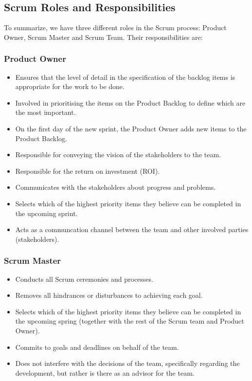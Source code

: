 \subsection{Scrum Roles and Responsibilities}

To summarize, we have three different roles in the Scrum process: Product Owner, Scrum Master and Scrum Team. Their responsibilities are:

\subsubsection{Product Owner}
\begin{itemize}
\item Ensures that the level of detail in the specification of the backlog items is appropriate for the work to be done.
\item Involved in prioritising the items on the Product Backlog to define which are the most important.
\item On the first day of the new sprint, the Product Owner adds new items to the Product Backlog.
\item Responsible for conveying the vision of the stakeholders to the team.
\item Responsible for the return on investment (ROI).
\item Communicates with the stakeholders about progress and problems.
\item Selects which of the highest priority items they believe can be completed in the upcoming sprint.
\item Acts as a communcation channel between the team and other involved parties (stakeholders).
\end{itemize}

\subsubsection{Scrum Master}
\begin{itemize}
\item Conducts all Scrum ceremonies and processes.
\item Removes all hindrances or disturbances to achieving each goal.
\item Selects which of the highest priority items they believe can be completed in the upcoming spring (together with the rest of the Scrum team and Product Owner).
\item Commits to goals and deadlines on behalf of the team.
\item Does not interfere with the decisions of the team, specifically regarding the development, but rather is there as an advisor for the team.
\end{itemize}

